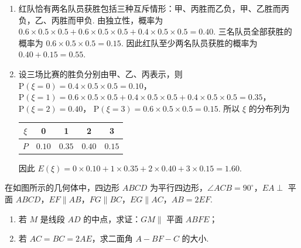 \begin{solution}
\begin{enumerate}
\item 红队恰有两名队员获胜包括三种互斥情形：甲、丙胜而乙负，甲、乙胜而丙负，乙、丙胜而甲负. 由独立性，概率为
\(0.6\times0.5\times0.5+0.6\times0.5\times0.5+0.4\times0.5\times0.5=0.40\).
三名队员全部获胜的概率为 \(0.6\times0.5\times0.5=0.15\). 因此红队至少两名队员获胜的概率为 \(0.40+0.15=0.55\).
\item 设三场比赛的胜负分别由甲、乙、丙表示，则
\(\mathrm P(\xi=0)=0.4\times0.5\times0.5=0.10\)，
\(\mathrm P(\xi=1)=0.6\times0.5\times0.5+0.4\times0.5\times0.5+0.4\times0.5\times0.5=0.35\)，
\(\mathrm P(\xi=2)=0.40\)，
\(\mathrm P(\xi=3)=0.6\times0.5\times0.5=0.15\).
所以 \(\xi\) 的分布列为
\begin{center}
\begin{tabular}{c|cccc}
\(\xi\) & 0 & 1 & 2 & 3 \\
\hline
\(P\) & \(0.10\) & \(0.35\) & \(0.40\) & \(0.15\)
\end{tabular}
\end{center}
因此 \(E(\xi)=0\times0.10+1\times0.35+2\times0.40+3\times0.15=1.60\).
\end{enumerate}
\end{solution}

\begin{problem}
在如图所示的几何体中，四边形 \(ABCD\) 为平行四边形，\(\angle ACB = 90^{\circ}\)，\(EA \perp\) 平面 \(ABCD\)，\(EF \parallel AB\)，\(FG \parallel BC\)，\(EG \parallel AC\)，\(AB = 2EF\).
\begin{enumerate}
\item 若 \(M\) 是线段 \(AD\) 的中点，求证：\(GM \parallel\) 平面 \(ABFE\)；
\item 若 \(AC = BC = 2AE\)，求二面角 \(A - BF - C\) 的大小.
\end{enumerate}

\end{problem}

